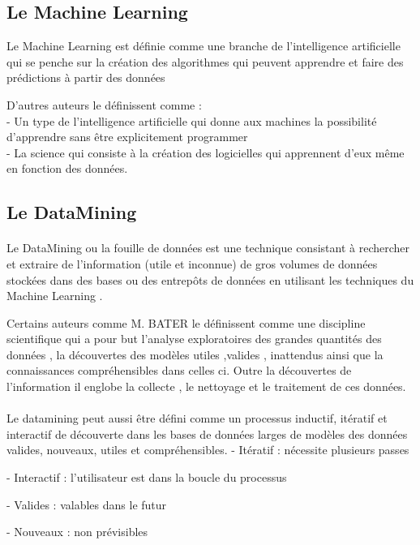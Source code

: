 \subsection{Le Machine Learning}
Le Machine Learning est définie comme une branche de l'intelligence artificielle qui se penche sur la création des algorithmes qui peuvent apprendre et faire des prédictions à partir des données\cite{DMandMLBook}

D'autres auteurs le définissent comme : \\
- Un type de l'intelligence artificielle qui donne aux machines la possibilité d'apprendre sans être explicitement programmer\cite{differenceMLDM2}  \\
- La science qui consiste à la création des logicielles qui apprennent d'eux même en fonction des données.\cite{differenceMLDM2}
\subsection{Le DataMining}
\paragraph{}
Le DataMining ou la  fouille de données est une technique  consistant à rechercher et extraire de l'information (utile et inconnue) de gros volumes de données stockées dans des bases ou des entrepôts de données en utilisant les techniques du Machine Learning .\cite{DMandMLBook}

Certains auteurs comme M. BATER\cite{MBaterBook} le définissent comme  une discipline scientifique qui a pour but l'analyse exploratoires des grandes quantités des données , la découvertes des modèles utiles ,valides , inattendus ainsi que  la connaissances compréhensibles dans celles ci. Outre la découvertes de l'information il englobe la collecte , le nettoyage et le traitement de ces données.
\paragraph{}
Le datamining peut aussi être défini comme un processus inductif, itératif  et interactif de découverte dans les bases de données  larges de modèles des données valides, nouveaux, utiles et compréhensibles.\cite{DMdef}
- 	Itératif :     nécessite plusieurs passes

- 	Interactif :   l'utilisateur est dans la boucle du processus

- 	Valides :     valables dans le futur

- 	Nouveaux : non prévisibles 

